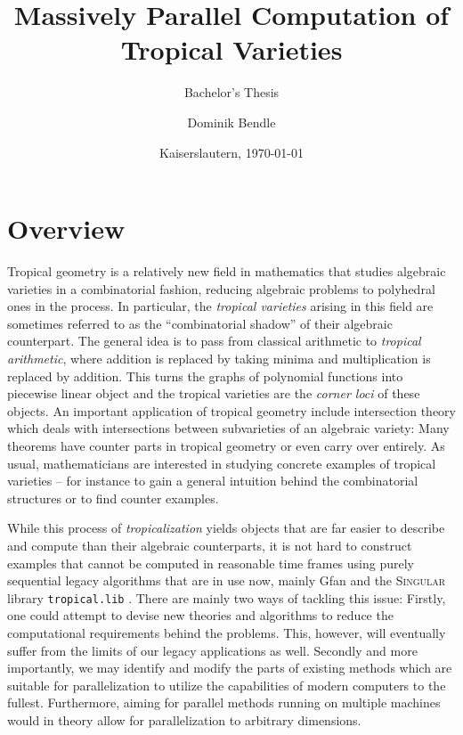 \documentclass[
  paper=a4,
  titlepage,
  bibliography=totoc,
  pagesize=pdftex
]{scrartcl}
\subtitle{Bachelor's Thesis}
\title{Massively Parallel Computation of Tropical Varieties}
\author{Dominik Bendle}
\date{Kaiserslautern, \today}
\numberwithin{figure}{section}
\numberwithin{equation}{section}
\numberwithin{table}{section}
\theoremstyle{definition}
\numberwithin{definition}{section}
\begin{document}
\pagestyle{headings}

\maketitle

\tableofcontents
\newpage
\listoffigures
\listoftables
\newpage


\section{Overview}

Tropical geometry is a relatively new field in mathematics that studies algebraic
varieties in a combinatorial fashion, reducing algebraic problems to polyhedral ones in
the process. In particular, the \emph{tropical varieties} arising in this field are
sometimes referred to as the \enquote{combinatorial shadow} of their algebraic
counterpart. The general idea is to pass from classical arithmetic to \emph{tropical
arithmetic}, where addition is replaced by taking minima and multiplication is replaced by
addition. This turns the graphs of polynomial functions into piecewise linear object and
the tropical varieties are the \emph{corner loci} of these objects. An important
application of tropical geometry include intersection theory which deals with
intersections between subvarieties of an algebraic variety: Many theorems have counter
parts in tropical geometry or even carry over entirely.
As usual, mathematicians are interested in studying concrete examples of tropical
varieties -- for instance to gain a general intuition behind the combinatorial structures
or to find counter examples.

While this process of \emph{tropicalization} yields objects that are far easier to
describe and compute than their algebraic counterparts, it is not hard to construct
examples that cannot be computed in reasonable time frames using purely sequential legacy
algorithms that are in use now, mainly Gfan \cite{gfan} and the \textsc{Singular} library
\texttt{tropical.lib} \cite{tropLib}. There are mainly two ways of tackling this issue:
Firstly, one could attempt to devise new theories and algorithms to reduce the
computational requirements behind the problems. This, however, will eventually suffer from
the limits of our legacy applications as well. Secondly and more importantly, we may
identify and modify the parts of existing methods which are suitable for parallelization
to utilize the capabilities of modern computers to the fullest. Furthermore, aiming for
parallel methods running on multiple machines would in theory allow for parallelization to
arbitrary dimensions.
\end{document}
